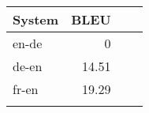 
\begin{tabular}{lrrr} \toprule

	System & BLEU \\
	\toprule
	en-de & 0 \\
	de-en & 14.51\\
	fr-en & 19.29 \\
	
	\bottomrule
	\small
	\centering
	\label{table:baselines}
	
\end{tabular}
